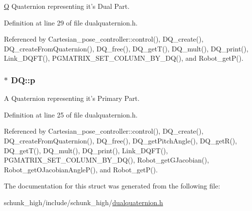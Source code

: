 \hyperlink{structQ}{Q} Quaternion representing it's Dual Part. 



Definition at line 29 of file dualquaternion.\-h.



Referenced by Cartesian\-\_\-pose\-\_\-controller\-::control(), D\-Q\-\_\-create(), D\-Q\-\_\-create\-From\-Quaternion(), D\-Q\-\_\-free(), D\-Q\-\_\-get\-T(), D\-Q\-\_\-mult(), D\-Q\-\_\-print(), Link\-\_\-\-D\-Q\-F\-T(), P\-G\-M\-A\-T\-R\-I\-X\-\_\-\-S\-E\-T\-\_\-\-C\-O\-L\-U\-M\-N\-\_\-\-B\-Y\-\_\-\-D\-Q(), and Robot\-\_\-get\-P().

\hypertarget{structDQ_a878210bff170f4392d6cbe2d4704ffdc}{
\subsubsection[{p}]{$\ast$ D\-Q\-::p}}\label{structDQ_a878210bff170f4392d6cbe2d4704ffdc}


A Quaternion representing it's Primary Part. 



Definition at line 25 of file dualquaternion.\-h.



Referenced by Cartesian\-\_\-pose\-\_\-controller\-::control(), D\-Q\-\_\-create(), D\-Q\-\_\-create\-From\-Quaternion(), D\-Q\-\_\-free(), D\-Q\-\_\-get\-Pitch\-Angle(), D\-Q\-\_\-get\-R(), D\-Q\-\_\-get\-T(), D\-Q\-\_\-mult(), D\-Q\-\_\-print(), Link\-\_\-\-D\-Q\-F\-T(), P\-G\-M\-A\-T\-R\-I\-X\-\_\-\-S\-E\-T\-\_\-\-C\-O\-L\-U\-M\-N\-\_\-\-B\-Y\-\_\-\-D\-Q(), Robot\-\_\-get\-G\-Jacobian(), Robot\-\_\-get\-O\-Jacobian\-Angle\-P(), and Robot\-\_\-get\-P().



The documentation for this struct was generated from the following file\-:\begin{DoxyCompactItemize}
\item 
schunk\-\_\-high/include/schunk\-\_\-high/\hyperlink{dualquaternion_8h}{dualquaternion.\-h}\end{DoxyCompactItemize}
